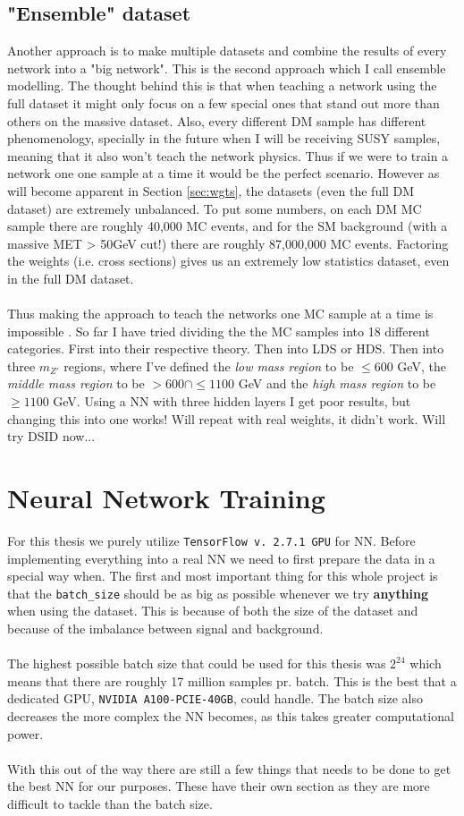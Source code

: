 \documentclass[14pt, a4paper]{book}
\begin{document}
\subsection{"Ensemble" dataset}
Another approach is to make multiple datasets and combine the results of every network into a "big network". This is the second approach which I call ensemble modelling. The thought behind this is that when teaching a network using the full dataset it might only focus on a few special ones that stand out more than others on the massive dataset. Also, every different DM sample has different phenomenology, specially in the future when I will be receiving SUSY samples, meaning that it also won't teach the network physics. Thus if we were to train a network one one sample at a time it would be the perfect scenario. However as will become apparent in Section \ref{sec:wgts}, the datasets (even the full DM dataset) are extremely unbalanced. To put some numbers, on each DM MC sample there are roughly 40,000 MC events, and for the SM background (with a massive MET > 50GeV cut!) there are roughly 87,000,000 MC events. Factoring the weights (i.e. cross sections) gives us an extremely low statistics dataset, even in the full DM dataset. \\
\\Thus making the approach to teach the networks one MC sample at a time is impossible . So far I have tried dividing the the MC samples into 18 different categories. First into their respective theory. Then into LDS or HDS. Then into three $m_{Z'}$ regions, where I've defined the \textit{low mass region} to be $\le 600$ GeV, the \textit{middle mass region} to be $>600 \cap\le 1100$ GeV and the\textit{ high mass region }to be $\ge 1100$ GeV. Using a NN with three hidden layers I get poor results, but changing this into one works! Will repeat with real weights, it didn't work. Will try DSID now...

\section{Neural Network Training}
For this thesis we purely utilize \verb|TensorFlow v. 2.7.1 GPU| for NN. Before implementing everything into a real NN we need to first prepare the data in a special way when.
The first and most important thing for this whole project is that the \verb|batch_size| should be as big as possible whenever we try \textbf{anything} when using the dataset.
This is because of both the size of the dataset and because of the imbalance between signal and background.\\
\\The highest possible batch size that could be used for this thesis was $2^{24}$ which means that there are roughly 17 million samples pr. batch. This is the best that a dedicated GPU, \verb|NVIDIA A100-PCIE-40GB|, could handle. 
The batch size also decreases the more complex the NN becomes, as this takes greater computational power.\\
\\With this out of the way there are still a few things that needs to be done to get the best NN for our purposes. These have their own section as they are more difficult to tackle than the batch size.
\end{document}
